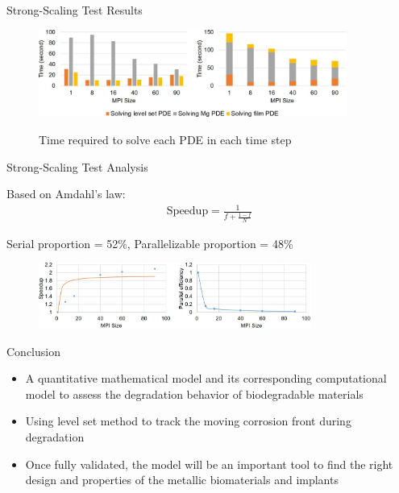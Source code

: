 \documentclass[11pt,t]{beamer}
\begin{document}
\begin{frame}[fragile]{Strong-Scaling Test Results}

	\vspace{1cm}
	
	\begin{figure}
	\centering
	\includegraphics[width=0.9\textwidth]{strong_scaling_results}
	
	\footnotesize Time required to solve each PDE in each time step
	
	\end{figure}

\end{frame}

\begin{frame}[fragile]{Strong-Scaling Test Analysis}

Based on Amdahl's law:
\begin{gather*}
\mathrm{Speedup} = \frac{1}{f + \frac{1-f}{N}}
\end{gather*}

Serial proportion = 52\%, Parallelizable proportion = 48\%
	\begin{figure}
			\centering
			\includegraphics[width=0.8\textwidth]{strong_scaling_analysis}
			
	\end{figure}
	


\end{frame}



\begin{frame}[fragile]{Conclusion}

\begin{itemize}
\item
A quantitative mathematical model and its corresponding computational model to assess the degradation behavior of biodegradable materials
\item 
Using level set method to track the moving corrosion front during degradation
\item
Once fully validated, the model will be an important tool to find the right design and properties of the metallic biomaterials and implants

\end{itemize}
	


\end{frame}
\end{document}
